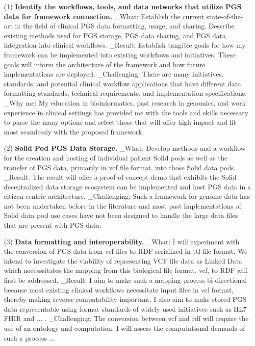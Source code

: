 \documentclass[11pt]{article}
\begin{document}
(1) \textbf{Identify the workflows, tools, and data networks that utilize PGS data for framework connection.}
_What: Establish the current state-of-the-art in the field of clinical PGS data formatting, usage, and sharing. 
Describe existing methods used for PGS storage, PGS data sharing, and PGS data integration into clinical workflows.
_Result: Establish tangible goals for how my framework can be implemented into existing workflows and initiatives. These goals will inform the architecture of the framework and how future implementations are deployed. 
_Challenging: There are many initiatives, standards, and potenital clinical workflow applications that have different data formatting standards, technical requirements, and implementation specifications. 
_Why me: My education in bioinformatics, past research in genomics, and work experience in clinical settings has provided me with the tools and skills necessary to parse the many options and select those that will offer high impact and fit most seamlessly with the proposed framework.


(2) \textbf{Solid Pod PGS Data Storage.}
_What: Develop methods and a workflow for the creation and hosting of individual patient Solid pods as well as the transfer of PGS data, primarily in vcf file format, into those Solid data pods. 
_Result: The result will offer a proof-of-concept demo that exhibits the Solid decentralized data storage ecosystem can be implemented and host PGS data in a citizen-centric architecture.
_Challenging: Such a framework for genome data has not been undertaken before in the literature and most past implementations of Solid data pod use cases have not been designed to handle the large data files that are present with PGS data. 


(3) \textbf{Data formatting and interoperability.} 
_What: I will experiment with the conversion of PGS data from vcf files to RDF serialized in ttl file format. 
We intend to investigate the viability of representing VCF file data as Linked Data which necesssitates the mapping from this biological file format, vcf, to RDF will first be addressed. 
_Result: I aim to make such a mapping process bi-directional because most existing clinical workflows necessitate input files in vcf format, thereby making reverse compatability important. 
I also aim to make stored PGS data representable using format standards of widely used initiatives such as HL7 FHIR and ... . 
_Challenging: The conversion between vcf and rdf will require the use of an ontology and computation. 
I will assess the computational demands of such a process ... 
\end{document}
